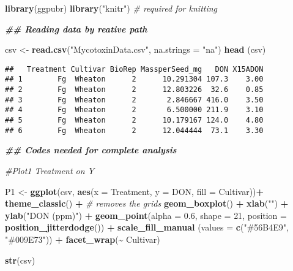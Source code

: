 \documentclass[
]{article}
\newenvironment{Shaded}{\begin{snugshade}}{\end{snugshade}}
\newcommand{\AttributeTok}[1]{\textcolor[rgb]{0.13,0.29,0.53}{#1}}
\newcommand{\CommentTok}[1]{\textcolor[rgb]{0.56,0.35,0.01}{\textit{#1}}}
\newcommand{\DecValTok}[1]{\textcolor[rgb]{0.00,0.00,0.81}{#1}}
\newcommand{\DocumentationTok}[1]{\textcolor[rgb]{0.56,0.35,0.01}{\textbf{\textit{#1}}}}
\newcommand{\FloatTok}[1]{\textcolor[rgb]{0.00,0.00,0.81}{#1}}
\newcommand{\FunctionTok}[1]{\textcolor[rgb]{0.13,0.29,0.53}{\textbf{#1}}}
\newcommand{\NormalTok}[1]{#1}
\newcommand{\OtherTok}[1]{\textcolor[rgb]{0.56,0.35,0.01}{#1}}
\newcommand{\SpecialCharTok}[1]{\textcolor[rgb]{0.81,0.36,0.00}{\textbf{#1}}}
\newcommand{\StringTok}[1]{\textcolor[rgb]{0.31,0.60,0.02}{#1}}
\begin{document}
\begin{Shaded}
\begin{Highlighting}[]
\FunctionTok{library}\NormalTok{(ggpubr)}
\FunctionTok{library}\NormalTok{(}\StringTok{"knitr"}\NormalTok{)  }\CommentTok{\# required for knitting}


\DocumentationTok{\#\# Reading data by reative path}

\NormalTok{csv }\OtherTok{\textless{}{-}} \FunctionTok{read.csv}\NormalTok{(}\StringTok{"MycotoxinData.csv"}\NormalTok{, }\AttributeTok{na.strings =} \StringTok{"na"}\NormalTok{)}
\FunctionTok{head}\NormalTok{ (csv)}
\end{Highlighting}
\end{Shaded}

\begin{verbatim}
##   Treatment Cultivar BioRep MassperSeed_mg   DON X15ADON
## 1        Fg  Wheaton      2      10.291304 107.3    3.00
## 2        Fg  Wheaton      2      12.803226  32.6    0.85
## 3        Fg  Wheaton      2       2.846667 416.0    3.50
## 4        Fg  Wheaton      2       6.500000 211.9    3.10
## 5        Fg  Wheaton      2      10.179167 124.0    4.80
## 6        Fg  Wheaton      2      12.044444  73.1    3.30
\end{verbatim}

\begin{Shaded}
\begin{Highlighting}[]
\DocumentationTok{\#\# Codes needed for complete analysis}

\CommentTok{\#Plot1 Treatment on Y}

\NormalTok{P1 }\OtherTok{\textless{}{-}} \FunctionTok{ggplot}\NormalTok{(csv, }\FunctionTok{aes}\NormalTok{(}\AttributeTok{x =}\NormalTok{ Treatment, }\AttributeTok{y =}\NormalTok{ DON, }\AttributeTok{fill =}\NormalTok{ Cultivar))}\SpecialCharTok{+}
  \FunctionTok{theme\_classic}\NormalTok{() }\SpecialCharTok{+}                \CommentTok{\# removes the grids}
  \FunctionTok{geom\_boxplot}\NormalTok{() }\SpecialCharTok{+} 
  \FunctionTok{xlab}\NormalTok{(}\StringTok{""}\NormalTok{) }\SpecialCharTok{+}
  \FunctionTok{ylab}\NormalTok{(}\StringTok{"DON (ppm)"}\NormalTok{) }\SpecialCharTok{+}
  \FunctionTok{geom\_point}\NormalTok{(}\AttributeTok{alpha =} \FloatTok{0.6}\NormalTok{, }\AttributeTok{shape =} \DecValTok{21}\NormalTok{, }\AttributeTok{position =} \FunctionTok{position\_jitterdodge}\NormalTok{()) }\SpecialCharTok{+}
  \FunctionTok{scale\_fill\_manual}\NormalTok{ (}\AttributeTok{values =} \FunctionTok{c}\NormalTok{(}\StringTok{"\#56B4E9"}\NormalTok{, }\StringTok{"\#009E73"}\NormalTok{)) }\SpecialCharTok{+}
  \FunctionTok{facet\_wrap}\NormalTok{(}\SpecialCharTok{\textasciitilde{}}\NormalTok{ Cultivar) }

\FunctionTok{str}\NormalTok{(csv)}
\end{Highlighting}
\end{Shaded}
\end{document}

